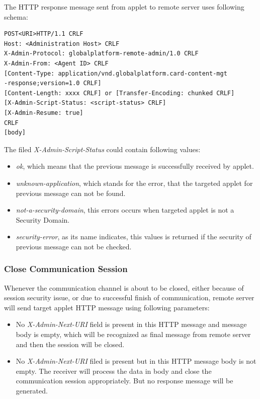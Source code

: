 The HTTP response message sent from applet to remote server uses following schema\cite{gp}:
\begin{Verbatim}[fontsize=\relsize{-1}, frame=lines,framesep=4mm, label=\fbox{\small\emph{Http Response Schema}}]
POST<URI>HTTP/1.1 CRLF
Host: <Administration Host> CRLF
X-Admin-Protocol: globalplatform-remote-admin/1.0 CRLF
X-Admin-From: <Agent ID> CRLF
[Content-Type: application/vnd.globalplatform.card-content-mgt
-response;version=1.0 CRLF]
[Content-Length: xxxx CRLF] or [Transfer-Encoding: chunked CRLF]
[X-Admin-Script-Status: <script-status> CRLF]
[X-Admin-Resume: true]
CRLF
[body]
\end{Verbatim}

The filed \emph{X-Admin-Script-Status} could contain following values:
 \begin{itemize}
  \item \emph{ok}, which means that the previous message is successfully received by applet.
  \item \emph{unknown-application}, which stands for the error, that the targeted applet for previous message can not be found.
\item \emph{not-a-security-domain}, this errors occurs when targeted applet is not a Security Domain.
\item \emph{security-error}, as its name indicates, this values is returned if the security of previous message  can not be checked.
\end{itemize}

\subsubsection{Close Communication Session}
Whenever the communication channel is about to be closed, either because of session security issue, or due to successful finish of communication, remote server will send target applet HTTP message using following parameters:
 \begin{itemize}
  \item No \emph{X-Admin-Next-URI} field is present in this HTTP message and message body is empty, which will be recognized as final message from remote server and then the session will be closed.
  \item No \emph{X-Admin-Next-URI} filed is present but in this HTTP message body is not empty. The receiver will process the data in body and close the communication session appropriately. But no response message will be generated.
\end{itemize}

